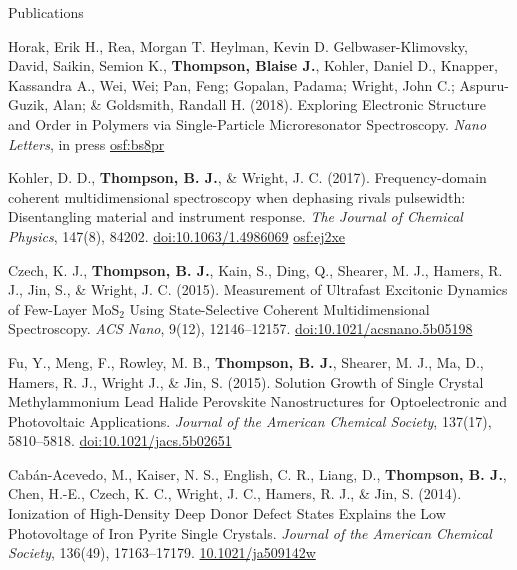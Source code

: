 \documentclass{resume}  %
\begin{document}
\begin{rSection}{Publications}
  \begin{etaremune}[leftmargin = 1.75em]
    \item Horak, Erik H., Rea, Morgan T. Heylman, Kevin D. Gelbwaser-Klimovsky, David, Saikin,
      Semion K., \textbf{Thompson, Blaise J.}, Kohler, Daniel D., Knapper, Kassandra A., Wei, Wei;
      Pan, Feng; Gopalan, Padama; Wright, John C.; Aspuru-Guzik, Alan; \& Goldsmith, Randall H.
      (2018).
      Exploring Electronic Structure and Order in Polymers via Single-Particle Microresonator
      Spectroscopy.
      \textit{Nano Letters}, in press
      \href{https://osf.io/bs8pr/}{osf:bs8pr}
    \item Kohler, D. D., \textbf{Thompson, B. J.}, \& Wright, J. C. (2017). Frequency-domain
      coherent multidimensional spectroscopy when dephasing rivals pulsewidth:
      Disentangling material and instrument response.
      \textit{The Journal of Chemical Physics}, 147(8), 84202.
      \href{https://doi.org/10.1063/1.4986069}{doi:10.1063/1.4986069}
      \href{https://osf.io/ej2xe/}{osf:ej2xe}
    \item Czech, K. J., \textbf{Thompson, B. J.}, Kain, S., Ding, Q., Shearer, M. J., Hamers,
      R. J., Jin, S., \& Wright, J. C. (2015). Measurement of Ultrafast Excitonic Dynamics of
      Few-Layer MoS$_2$ Using State-Selective Coherent Multidimensional Spectroscopy.
      \textit{ACS Nano}, 9(12), 12146–12157.
      \href{https://doi.org/10.1021/acsnano.5b05198}{doi:10.1021/acsnano.5b05198}
    \item Fu, Y., Meng, F., Rowley, M. B., \textbf{Thompson, B. J.}, Shearer, M. J.,
      Ma, D., Hamers, R. J., Wright J., \& Jin, S. (2015). Solution Growth of Single Crystal
      Methylammonium Lead Halide Perovskite Nanostructures for Optoelectronic and
      Photovoltaic Applications.
      \textit{Journal of the American Chemical Society}, 137(17), 5810–5818.
      \href{https://doi.org/10.1021/jacs.5b02651}{doi:10.1021/jacs.5b02651}
    \item Cabán-Acevedo, M., Kaiser, N. S., English, C. R., Liang, D., \textbf{Thompson, B. J.},
      Chen, H.-E., Czech, K. C., Wright, J. C., Hamers, R. J., \& Jin, S. (2014).
      Ionization of High-Density Deep Donor Defect States Explains the Low
      Photovoltage of Iron Pyrite Single Crystals.
      \textit{Journal of the American Chemical Society}, 136(49), 17163–17179.
      \href{https://doi.org/10.1021/ja509142w}{10.1021/ja509142w}
  \end{etaremune}
\end{rSection}
\end{document}
